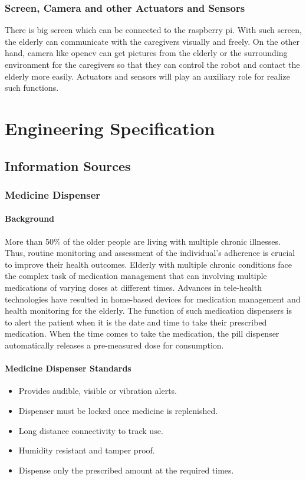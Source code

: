 \documentclass[12pt]{article}
\newcommand{\gadd}[1]{{\color{gray} #1}}
\begin{document}
{\subsubsection{Screen, Camera and other Actuators and Sensors}
There is big screen which can be connected to the raspberry pi. With such screen, the elderly can communicate with the caregivers visually and freely. On the other hand, camera like opencv can get pictures from the elderly or the surrounding environment for the caregivers so that they can control the robot and contact the elderly more easily. Actuators and sensors will play an auxiliary role for realize such functions.
}
\section{Engineering Specification}
\gadd{
\subsection{Information Sources}
\subsubsection{Medicine Dispenser}
\paragraph{Background}
More than 50\% of the older people are living with multiple chronic illnesses\cite{2}. Thus, routine monitoring and assessment of the individual’s adherence is crucial to improve their health outcomes. Elderly with multiple chronic conditions face the complex task of medication management that can involving multiple medications of varying doses at different times. Advances in tele-health technologies have resulted in home-based devices for medication management and health monitoring for the elderly\cite{3}. The function of such medication dispensers is to alert the patient when it is the date and time to take their prescribed medication\cite{4}. When the time comes to take the medication, the pill dispenser automatically releases a pre-measured dose for consumption.
\paragraph{Medicine Dispenser Standards\cite{5}}
\begin{itemize}
    \item Provides audible, visible or vibration alerts.
    \item Dispenser must be locked once medicine is replenished.
    \item Long distance connectivity to track use.
    \item Humidity resistant and tamper proof.
    \item Dispense only the prescribed amount at the required times.
\end{itemize}
}
\end{document}
